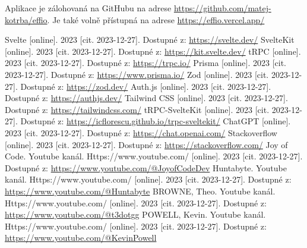 \documentclass[12pt, a4paper,
openright
]{report}
\let\oldchapter\chapter
\renewcommand{\chapter}{
	\clearpage
	\pagestyle{fancy}
	\oldchapter
}
\begin{document}
\noindent Aplikace je zálohovaná na GitHubu na adrese \url{https://github.com/matej-kotrba/effio}.
Je také volně přístupná na adrese \url{https://effio.vercel.app/}
	
	\renewcommand\bibname{Seznam použitých informačních zdrojů}
	\begin{thebibliography}{99}
		
		 Svelte [online]. 2023 [cit. 2023-12-27]. Dostupné z: \url{https://svelte.dev/}
		 SvelteKit [online]. 2023 [cit. 2023-12-27]. Dostupné z:  \url{https://kit.svelte.dev/}
		 tRPC [online]. 2023 [cit. 2023-12-27]. Dostupné z: \url{https://trpc.io/}
		 Prisma [online]. 2023 [cit. 2023-12-27]. Dostupné z: \url{https://www.prisma.io/}
		 Zod [online]. 2023 [cit. 2023-12-27]. Dostupné z: \url{https://zod.dev/}
		 Auth.js [online]. 2023 [cit. 2023-12-27]. Dostupné z: \url{https://authjs.dev/}
		 Tailwind CSS [online]. 2023 [cit. 2023-12-27]. Dostupné z: \url{https://tailwindcss.com/}
		 tRPC-SvelteKit [online]. 2023 [cit. 2023-12-27]. Dostupné z: \url{https://icflorescu.github.io/trpc-sveltekit/}
		 ChatGPT [online]. 2023 [cit. 2023-12-27]. Dostupné z: \url{https://chat.openai.com/}
		 Stackoverflow [online]. 2023 [cit. 2023-12-27]. Dostupné z: \url{https://stackoverflow.com/}
		Joy of Code. Youtube kanál. Https://www.youtube.com/ [online]. 2023 [cit. 2023-12-27]. Dostupné z: \url{https://www.youtube.com/@JoyofCodeDev}
		Huntabyte. Youtube kanál. Https://www.youtube.com/ [online]. 2023 [cit. 2023-12-27]. Dostupné z: \url{https://www.youtube.com/@Huntabyte}
		BROWNE, Theo. Youtube kanál. Https://www.youtube.com/ [online]. 2023 [cit. 2023-12-27]. Dostupné z: \url{https://www.youtube.com/@t3dotgg}
		POWELL, Kevin. Youtube kanál. Https://www.youtube.com/ [online]. 2023 [cit. 2023-12-27]. Dostupné z: \url{https://www.youtube.com/@KevinPowell}
		\
		
	\end{thebibliography}
	
	\listoffigures
	

	\appendix %
	
	\titleformat{\chapter}[block]{\scshape\bfseries\LARGE}{Příloha \thechapter}{10pt}{\vspace{0pt}}[\vspace{-22pt}] %
	
\end{document}
